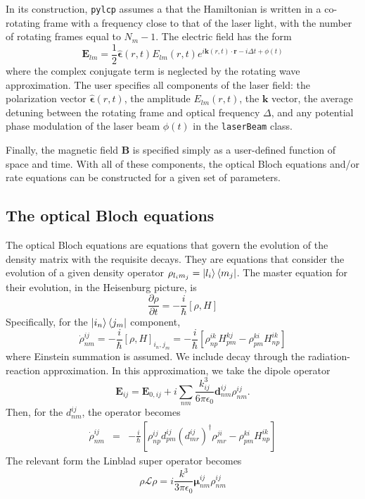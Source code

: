 \documentclass[final,5p,times,twocolumn]{elsarticle}
\newcounter{bla}
\begin{document}
In its construction, {\tt pylcp} assumes a that the Hamiltonian is written in a co-rotating frame with a frequency close to that of the laser light, with the number of rotating frames equal to $N_m-1$.  The electric field has the form
\begin{equation}
	\mathbf{E}_{lm} = \frac{1}{2}\hat{\boldsymbol{\epsilon}}(r, t) E_{lm}(r, t)e^{i\mathbf{k}(r,t)\cdot\mathbf{r}-i \Delta t + \phi(t)}
\end{equation}
where the complex conjugate term is neglected by the rotating wave approximation.  The user specifies all components of the laser field: the polarization vector $\hat{\boldsymbol{\epsilon}}(r, t)$, the amplitude $E_{lm}(r, t)$, the $\mathbf{k}$ vector, the average detuning between the rotating frame and optical frequency $\Delta$,  and any potential phase modulation of the laser beam $\phi(t)$ in the {\tt laserBeam} class.

Finally, the magnetic field $\mathbf{B}$ is specified simply as a user-defined function  of space and time.  With all of these components, the optical Bloch equations and/or rate equations can be constructed for a given set of parameters.

\subsection{The optical Bloch equations}
The optical Bloch equations are equations that govern the evolution of the density matrix with the requisite decays.  They are equations that consider the evolution of a given density operator $\rho_{l_im_j} = \ket{l_i}\Bra{m_j}$.  The master equation for their evolution, in the Heisenburg picture, is
\begin{equation}
	\frac{\partial \rho}{\partial t} = -\frac{i}{\hbar}[\rho, H]
\end{equation}
Specifically, for the $\ket{i_n}\Bra{j_m}$ component,
\begin{equation}
	\dot{\rho}^{ij}_{nm} = -\frac{i}{\hbar}[\rho, H]_{i_n, j_m} = -\frac{i}{\hbar}\left[\rho^{ik}_{np}H^{kj}_{pm} - \rho^{ki}_{pm}H^{ik}_{np}\right]
\end{equation}
where Einstein summation is assumed.  We include decay through the radiation-reaction approximation.  In this approximation, we take the dipole operator
\begin{equation}
	\mathbf{E}_{ij} = \mathbf{E}_{0, ij} + i\sum_{nm}\frac{k_{ij}^3}{6\pi\epsilon_0}\boldsymbol{d}^{ij}_{nm} \rho^{ij}_{nm}.
\end{equation}
Then, for the $d^{ij}_{nm}$, the operator becomes
\begin{eqnarray}
	\dot{\rho}^{ij}_{nm} & = & -\frac{i}{\hbar}\left[\rho^{ij}_{np}d^{ij}_{pm}(d^{ij}_{mr})^\dagger\rho^{ji}_{mr} - \rho^{ki}_{pm}H^{ik}_{np}\right]
\end{eqnarray}
The relevant form the Linblad super operator becomes
\begin{equation}
	\rho\mathcal{L}\rho = i\frac{k^3}{3\pi\epsilon_0}\boldsymbol{\mu}^{ij}_{nm} \rho^{ij}_{nm}
\end{equation}
\end{document}
